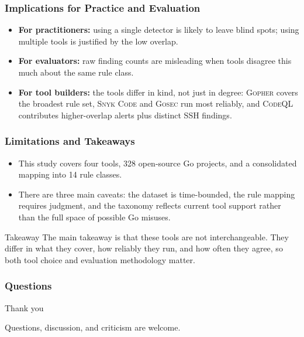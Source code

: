 \documentclass[10pt]{beamer}
\newcommand{\CodeQL}{\textsc{CodeQL}\xspace}
\newcommand{\Gopher}{\textsc{Gopher}\xspace}
\newcommand{\Gosec}{\textsc{Gosec}\xspace}
\newcommand{\SnykCode}{\textsc{Snyk Code}\xspace}
\begin{document}
\begin{frame}
    \frametitle{Implications for Practice and Evaluation}
    \begin{itemize}
        \setlength{\itemsep}{0.7em}
        \item \textbf{For practitioners:} using a single detector is likely to leave blind spots; using multiple tools is justified by the low overlap.
        \item \textbf{For evaluators:} raw finding counts are misleading when tools disagree this much about the same rule class.
        \item \textbf{For tool builders:} the tools differ in kind, not just in degree: \Gopher covers the broadest rule set, \SnykCode and \Gosec run most reliably, and \CodeQL contributes higher-overlap alerts plus distinct SSH findings.
    \end{itemize}
\end{frame}

\begin{frame}
    \frametitle{Limitations and Takeaways}
    \begin{itemize}
        \setlength{\itemsep}{0.55em}
        \item This study covers four tools, 328 open-source Go projects, and a consolidated mapping into 14 rule classes.
        \item There are three main caveats: the dataset is time-bounded, the rule mapping requires judgment, and the taxonomy reflects current tool support rather than the full space of possible Go misuses.
    \end{itemize}
    \vspace{0.5em}
    \begin{block}{Takeaway}
        The main takeaway is that these tools are not interchangeable. They differ in what they cover, how reliably they run, and how often they agree, so both tool choice and evaluation methodology matter.
    \end{block}
\end{frame}

\begin{frame}
    \frametitle{Questions}
    \begin{center}
        \Large Thank you

        \vspace{0.7em}
        \normalsize
        Questions, discussion, and criticism are welcome.
    \end{center}
\end{frame}
\end{document}
